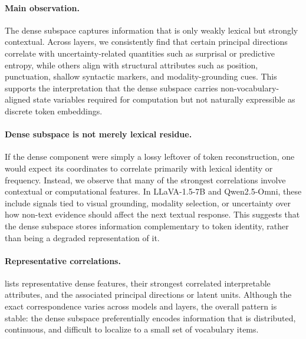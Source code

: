 \documentclass{article}
\begin{document}
\paragraph{Main observation.}
The dense subspace captures information that is only weakly lexical but strongly contextual.
Across layers, we consistently find that certain principal directions correlate with uncertainty-related quantities such as surprisal or predictive entropy, while others align with structural attributes such as position, punctuation, shallow syntactic markers, and modality-grounding cues. This supports the interpretation that the dense subspace carries non-vocabulary-aligned state variables required for computation but not naturally expressible as discrete token embeddings.

\paragraph{Dense subspace is not merely lexical residue.}
If the dense component were simply a lossy leftover of token reconstruction, one would expect its coordinates to correlate primarily with lexical identity or frequency.
Instead, we observe that many of the strongest correlations involve contextual or computational features. In LLaVA-1.5-7B and Qwen2.5-Omni, these include signals tied to visual grounding, modality selection, or uncertainty over how non-text evidence should affect the next textual response.
This suggests that the dense subspace stores information complementary to token identity, rather than being a degraded representation of it.

\paragraph{Representative correlations.}
 lists representative dense features, their strongest correlated interpretable attributes, and the associated principal directions or latent units.
Although the exact correspondence varies across models and layers, the overall pattern is stable: the dense subspace preferentially encodes information that is distributed, continuous, and difficult to localize to a small set of vocabulary items.
\end{document}
